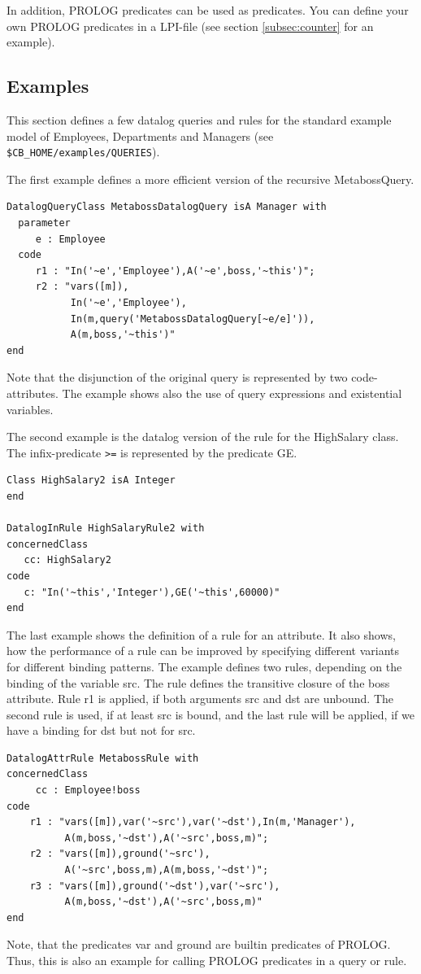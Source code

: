 In addition, PROLOG predicates can be used as predicates. You can define your own PROLOG
predicates in a LPI-file (see section \ref{subsec:counter} for an example).

\subsection{Examples}

This section defines a few datalog queries and rules for the standard example model
of Employees, Departments and Managers (see \verb+$CB_HOME/examples/QUERIES+).

The first example defines a more efficient version of the recursive {\ttfamily MetabossQuery}.

\begin{verbatim}
DatalogQueryClass MetabossDatalogQuery isA Manager with
  parameter
     e : Employee
  code
     r1 : "In('~e','Employee'),A('~e',boss,'~this')";
     r2 : "vars([m]),
           In('~e','Employee'),
           In(m,query('MetabossDatalogQuery[~e/e]')),
           A(m,boss,'~this')"
end
\end{verbatim}

Note that the disjunction of the original query is represented by two code-attributes.
The example shows also the use of query expressions and existential variables.

The second example is the datalog version of the rule for the HighSalary class.
The infix-predicate \verb+>=+ is represented by the predicate {\ttfamily GE}.

\begin{verbatim}
Class HighSalary2 isA Integer
end

DatalogInRule HighSalaryRule2 with
concernedClass
   cc: HighSalary2
code
   c: "In('~this','Integer'),GE('~this',60000)"
end
\end{verbatim}


The last example shows the definition of a rule for an attribute. It also
shows, how the performance of a rule can be improved by specifying different
variants for different binding patterns. The example defines two rules,
depending on the binding of the variable {\ttfamily src}. The rule
defines the transitive closure of the {\ttfamily boss} attribute.
Rule {\ttfamily r1} is applied, if both arguments {\ttfamily src}
and {\ttfamily dst} are unbound. The second rule is used, if at least {\ttfamily src}
is bound, and the last rule will be applied, if we have a binding
for  {\ttfamily dst} but not for {\ttfamily src}.

\begin{verbatim}
DatalogAttrRule MetabossRule with
concernedClass
     cc : Employee!boss
code
    r1 : "vars([m]),var('~src'),var('~dst'),In(m,'Manager'),
          A(m,boss,'~dst'),A('~src',boss,m)";
    r2 : "vars([m]),ground('~src'),
          A('~src',boss,m),A(m,boss,'~dst')";
    r3 : "vars([m]),ground('~dst'),var('~src'),
          A(m,boss,'~dst'),A('~src',boss,m)"
end
\end{verbatim}

Note, that the predicates {\ttfamily var} and {\ttfamily ground}
are builtin predicates of PROLOG. Thus, this is also an example
for calling PROLOG predicates in a query or rule.

